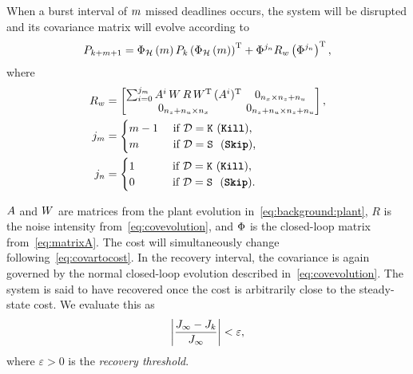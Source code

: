 When a burst interval of $m$ missed deadlines occurs, the system will be disrupted and its covariance matrix will evolve according to
%
\begin{equation}
\label{eq:covariance-evolution}
    P_{k+\nummisses+1} = \clmat{}_{\strat}\funof{m} P_k \left( \clmat{}_{\strat}\funof{m} \right)^\T + \clmat{}^{j_{\numhits}} R_w \left( \clmat{}^{j_{\numhits}} \right)^\T,
\end{equation}
where
\begin{equation}
\label{eq:evolutionparameters}
\setlength\arraycolsep{2pt}
    \begin{aligned}
        R_w &= 
        \begin{bmatrix} 
            \sum_{i=0}^{j_{\nummisses}} \Ap^i\,\Wp\,R\,\Wp^\T\,(\Ap^i)^\T & 0_{n_x \times n_z+n_u} \\ 
            0_{n_z + n_u \times n_x}               & 0_{n_z + n_u \times n_z+ n_u}
        \end{bmatrix}, \\
        j_{\nummisses} &= 
        \begin{cases} 
            \nummisses - 1 & \text{ if } \dstrat = \Kill\,\, \text{(\tK{}),} \\ 
            \nummisses & \text{ if } \dstrat = \Skip\,\,\,\, \text{(\tS{}),} 
        \end{cases} \\
        j_{\numhits} &= 
        \begin{cases} 
            1 \phantom{||222} & \text{ if } \dstrat = \Kill\,\, \text{(\tK{}),} \\ 
            0 & \text{ if } \dstrat = \Skip\,\,\,\, \text{(\tS{}).}
        \end{cases}
        \end{aligned}
\end{equation}

$A$ and $W$ are matrices from the plant evolution in~\eqref{eq:background:plant}, $R$ is the noise intensity from~\eqref{eq:covevolution}, and $\Phi{}$ is the closed-loop matrix from~\eqref{eq:matrixA}.
The cost will simultaneously change following~\eqref{eq:covartocost}.
In the recovery interval, the covariance is again governed by the normal closed-loop evolution described in~\eqref{eq:covevolution}.
The system is said to have recovered once the cost is arbitrarily close to the steady-state cost.
We evaluate this as
%
\begin{equation}
    \label{eq:cost-threshold}
    \abs{\frac{J_{\infty}-J_k}{J_\infty}} < \varepsilon,
\end{equation}
where $\varepsilon> 0$ is the \emph{recovery threshold}.

